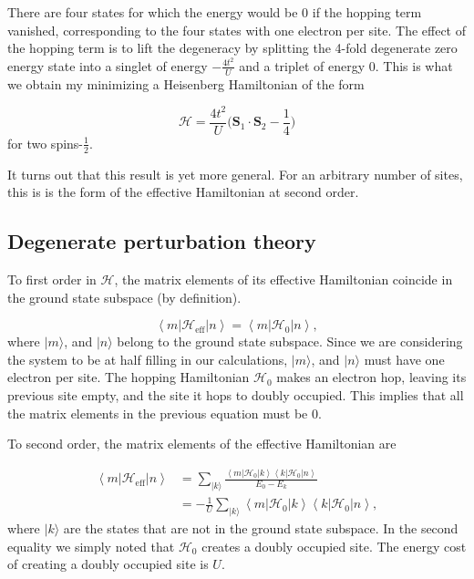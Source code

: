 There are four states for which the energy would be 0 if the hopping term vanished, corresponding to the four states with one electron per site.
The effect of the hopping term is to lift the degeneracy by splitting the 4-fold degenerate zero energy state into a singlet of energy $-\frac{4t^2}{U}$ and a triplet of energy $0$.
This is what we obtain my minimizing a Heisenberg Hamiltonian of the form

\begin{equation}
\mathcal{H} = \frac{4t^2}{U} \bigg( \bm S_1 \cdot \bm S_2 - \frac{1}{4} \bigg)
\end{equation}
for two spins-$\frac{1}{2}$.

It turns out that this result is yet more general.
For an arbitrary number of sites, this is is the form of the effective Hamiltonian at second order.

\subsection{Degenerate perturbation theory}

To first order in $\mathcal{H}$, the matrix elements of its effective Hamiltonian coincide in the ground state subspace (by definition).

\begin{equation}
\left\langle m | \mathcal{H}_{\text{eff}} | n \right\rangle = \left\langle m | \mathcal{H}_0 | n \right\rangle ,
\end{equation}
where $| m \rangle$, and $| n \rangle$ belong to the ground state subspace.
Since we are considering the system to be at half filling in our calculations, $| m\rangle$, and $| n \rangle$ must have one electron per site.
The hopping Hamiltonian $\mathcal{H}_0$ makes an electron hop, leaving its previous site empty, and the site it hops to doubly occupied.
This implies that all the matrix elements in the previous equation must be 0.

To second order, the matrix elements of the effective Hamiltonian are

\begin{equation}
\begin{split}
\left \langle m | \mathcal{H}_{\text{eff}} | n \right\rangle &= \sum_{ | k \rangle} \frac{\left\langle m | \mathcal{H}_0 | k \right\rangle \left\langle k | \mathcal{H}_0 | n \right\rangle }{E_0 - E_k} \\
&=-\frac{1}{U} \sum_{ | k \rangle} \left\langle m | \mathcal{H}_0 | k \right\rangle \left\langle k | \mathcal{H}_0 | n \right\rangle ,
\end{split}
\end{equation}
where $| k \rangle$ are the states that are not in the ground state subspace.
In the second equality we simply noted that $\mathcal{H}_0$ creates a doubly occupied site.
The energy cost of creating a doubly occupied site is $U$. 

